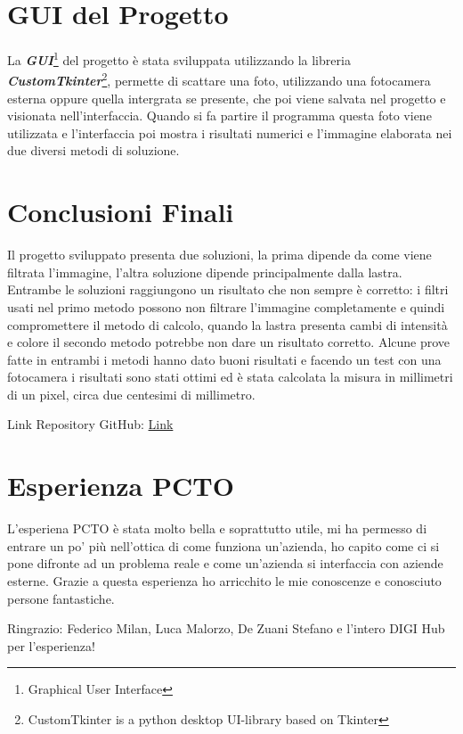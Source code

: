 \documentclass[a4paper, notitlepage, 12pt]{article}
\begin{document}
    \section{GUI del Progetto}
    \noindent La \emph{\textbf{GUI}}\footnote[12]{\indent Graphical User Interface} del progetto è stata sviluppata utilizzando la libreria \emph{\textbf{CustomTkinter}}\footnote[13]{\indent CustomTkinter is a python desktop UI-library based on Tkinter},
    permette di scattare una foto, utilizzando una fotocamera esterna oppure quella intergrata se presente, che poi viene salvata nel progetto e visionata nell'interfaccia.
    Quando si fa partire il programma questa foto viene utilizzata e l'interfaccia poi mostra i risultati numerici e l'immagine elaborata nei due diversi metodi di soluzione.
    \section{Conclusioni Finali}
    \noindent Il progetto sviluppato presenta due soluzioni, la prima dipende da come viene filtrata l'immagine, l'altra soluzione dipende principalmente dalla lastra.
    Entrambe le soluzioni raggiungono un risultato che non sempre è corretto: i filtri usati nel primo metodo possono non filtrare l'immagine completamente e quindi compromettere 
    il metodo di calcolo, quando la lastra presenta cambi di intensità e colore il secondo metodo potrebbe non dare un risultato corretto.
    Alcune prove fatte in entrambi i metodi hanno dato buoni risultati e facendo un test con una fotocamera i risultati sono stati ottimi ed è stata calcolata la misura in millimetri 
    di un pixel, circa due centesimi di millimetro.\par
    \noindent Link Repository GitHub: \href{https://github.com/RPette/Lavoro_Pettenuzzo_Riccardo_Stage_2023/}{Link}
    \section{Esperienza PCTO}
    \noindent L'esperiena PCTO è stata molto bella e soprattutto utile, mi ha permesso di entrare un po' più nell'ottica di come funziona un'azienda, ho capito come ci si pone difronte ad un problema reale
    e come un'azienda si interfaccia con aziende esterne. Grazie a questa esperienza ho arricchito le mie conoscenze e conosciuto persone fantastiche.\par
    \noindent Ringrazio: Federico Milan, Luca Malorzo, De Zuani Stefano e l'intero DIGI Hub per l'esperienza!
\end{document}
